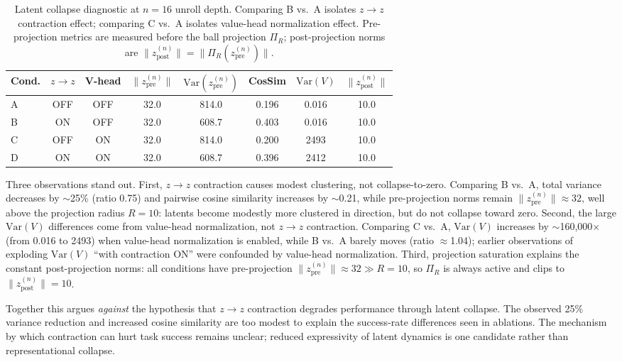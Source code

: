 \documentclass{article}
\theoremstyle{plain}
\theoremstyle{definition}
\theoremstyle{remark}
\begin{document}
\begin{table}[t]
\caption{Latent collapse diagnostic at $n{=}16$ unroll depth.
Comparing B vs.\ A isolates $z\!\to\!z$ contraction effect; comparing C vs.\ A isolates value-head normalization effect.
Pre-projection metrics are measured before the ball projection $\Pi_R$; post-projection norms are $\|z^{(n)}_{\text{post}}\|=\|\Pi_R(z^{(n)}_{\text{pre}})\|$.}
\label{tab:latent_collapse}
\centering
\small
\begin{tabular}{@{}lccccccc@{}}
\toprule
Cond. & $z\!\to\!z$ & V-head & $\|z^{(n)}_{\text{pre}}\|$ & $\mathrm{Var}(z^{(n)}_{\text{pre}})$ & CosSim & $\mathrm{Var}(V)$ & $\|z^{(n)}_{\text{post}}\|$ \\
\midrule
A & OFF & OFF & 32.0 & 814.0 & 0.196 & 0.016 & 10.0 \\
B & ON & OFF & 32.0 & 608.7 & 0.403 & 0.016 & 10.0 \\
C & OFF & ON & 32.0 & 814.0 & 0.200 & 2493 & 10.0 \\
D & ON & ON & 32.0 & 608.7 & 0.396 & 2412 & 10.0 \\
\bottomrule
\end{tabular}
\end{table}

Three observations stand out. First, $z\!\to\!z$ contraction causes modest clustering, not collapse-to-zero. Comparing B vs.\ A, total variance decreases by $\sim$25\% (ratio 0.75) and pairwise cosine similarity increases by $\sim$0.21, while pre-projection norms remain $\|z^{(n)}_{\text{pre}}\|\approx 32$, well above the projection radius $R{=}10$: latents become modestly more clustered in direction, but do not collapse toward zero. Second, the large $\mathrm{Var}(V)$ differences come from value-head normalization, not $z\!\to\!z$ contraction. Comparing C vs.\ A, $\mathrm{Var}(V)$ increases by $\sim$160{,}000$\times$ (from 0.016 to 2493) when value-head normalization is enabled, while B vs.\ A barely moves (ratio $\approx$1.04); earlier observations of exploding $\mathrm{Var}(V)$ ``with contraction ON'' were confounded by value-head normalization. Third, projection saturation explains the constant post-projection norms: all conditions have pre-projection $\|z^{(n)}_{\text{pre}}\|\approx 32 \gg R{=}10$, so $\Pi_R$ is always active and clips to $\|z^{(n)}_{\text{post}}\|=10$.

Together this argues \emph{against} the hypothesis that $z\!\to\!z$ contraction degrades performance through latent collapse. The observed 25\% variance reduction and increased cosine similarity are too modest to explain the success-rate differences seen in ablations. The mechanism by which contraction can hurt task success remains unclear; reduced expressivity of latent dynamics is one candidate rather than representational collapse.
\end{document}
